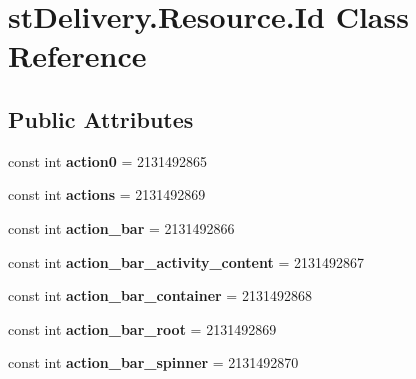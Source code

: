 \hypertarget{classst_delivery_1_1_resource_1_1_id}{}\section{st\+Delivery.\+Resource.\+Id Class Reference}
\label{classst_delivery_1_1_resource_1_1_id}
\subsection*{Public Attributes}
\begin{DoxyCompactItemize}
\item 
\mbox{\label{classst_delivery_1_1_resource_1_1_id_a807858f228771b0b7e29ddd9643b779a}} 
const int {\bfseries action0} = 2131492865
\item 
\mbox{\label{classst_delivery_1_1_resource_1_1_id_a887415c72d06736dd3c9b7ad02262280}} 
const int {\bfseries actions} = 2131492869
\item 
\mbox{\label{classst_delivery_1_1_resource_1_1_id_aa75e387a7ac119f4b3329fe961119b4b}} 
const int {\bfseries action\+\_\+bar} = 2131492866
\item 
\mbox{\label{classst_delivery_1_1_resource_1_1_id_abf9831a7197a88c9d92cc67b9ac4acc4}} 
const int {\bfseries action\+\_\+bar\+\_\+activity\+\_\+content} = 2131492867
\item 
\mbox{\label{classst_delivery_1_1_resource_1_1_id_a551cbe42227b13d1f799f2be720b4a75}} 
const int {\bfseries action\+\_\+bar\+\_\+container} = 2131492868
\item 
\mbox{\label{classst_delivery_1_1_resource_1_1_id_a2590e391b34c9923cd87905f791393d9}} 
const int {\bfseries action\+\_\+bar\+\_\+root} = 2131492869
\item 
\mbox{\label{classst_delivery_1_1_resource_1_1_id_afd72c2e1166392993c4c39c9eaad5138}} 
const int {\bfseries action\+\_\+bar\+\_\+spinner} = 2131492870
\item 

\end{DoxyCompactItemize}
